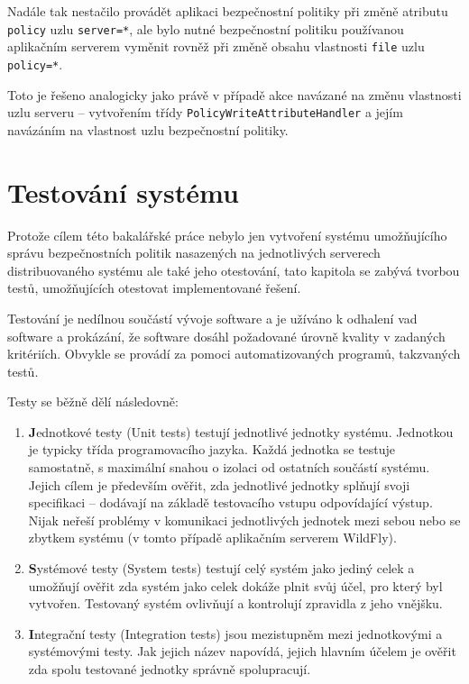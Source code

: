 Nadále tak nestačilo provádět aplikaci bezpečnostní politiky při změně atributu {\tt policy} uzlu {\tt server=*}, ale bylo nutné bezpečnostní politiku používanou aplikačním serverem vyměnit rovněž při změně obsahu vlastnosti {\tt file} uzlu {\tt policy=*}.

Toto je řešeno analogicky jako právě v případě akce navázané na změnu vlastnosti uzlu serveru -- vytvořením třídy {\tt PolicyWriteAttributeHandler} a jejím navázáním na vlastnost uzlu bezpečnostní politiky.

\chapter{Testování systému}

Protože cílem této bakalářské práce nebylo jen vytvoření systému umožňujícího správu bezpečnostních politik nasazených na jednotlivých serverech distribuovaného systému ale také jeho otestování, tato kapitola se zabývá tvorbou testů, umožňujících otestovat implementované řešení.

Testování je nedílnou součástí vývoje software a je užíváno k odhalení vad software a prokázání, že software dosáhl požadované úrovně kvality v zadaných kritériích. Obvykle se provádí za pomoci automatizovaných programů, takzvaných testů. \cite{ivsTest}

Testy se běžně dělí následovně: \cite{testsTypes}\cite{ivsTest}

\begin{enumerate}
  
  \item {\textbf Jednotkové testy (Unit tests)} testují jednotlivé jednotky systému. Jednotkou je typicky třída programovacího jazyka. Každá jednotka se testuje samostatně, s maximální snahou o izolaci od ostatních součástí systému. Jejich cílem je především ověřit, zda jednotlivé jednotky splňují svoji specifikaci -- dodávají na základě testovacího vstupu odpovídající výstup. Nijak neřeší problémy v komunikaci jednotlivých jednotek mezi sebou nebo se zbytkem systému (v tomto případě aplikačním serverem WildFly). \cite{testsTypes}\cite{ivsTest}
  
  \item {\textbf Systémové testy (System tests)} testují celý systém jako jediný celek a umožňují ověřit zda systém jako celek dokáže plnit svůj účel, pro který byl vytvořen. Testovaný systém ovlivňují a kontrolují zpravidla z jeho vnějšku. \cite{testsTypes}\cite{ivsTest}
  
  \item {\textbf Integrační testy (Integration tests)} jsou mezistupněm mezi jednotkovými a systémovými testy. Jak jejich název napovídá, jejich hlavním účelem je ověřit zda spolu testované jednotky správně spolupracují. \cite{testsTypes}\cite{ivsTest}
  
\end{enumerate}

